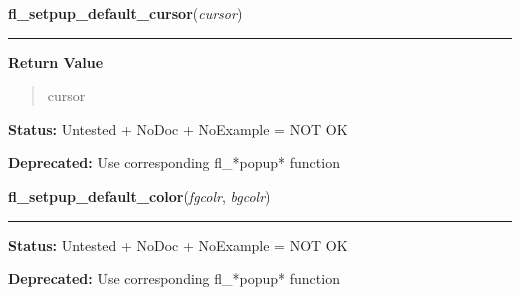     \label{xformslib:deprecated:fl_setpup_default_cursor}

    \vspace{0.5ex}

\hspace{.8\funcindent}\begin{boxedminipage}{\funcwidth}

    \raggedright \textbf{fl\_setpup\_default\_cursor}(\textit{cursor})

    \vspace{-1.5ex}

    \rule{\textwidth}{0.5\fboxrule}
\setlength{\parskip}{2ex}
\setlength{\parskip}{1ex}
      \textbf{Return Value}
    \vspace{-1ex}

      \begin{quote}
      cursor

      \end{quote}

\textbf{Status:} Untested + NoDoc + NoExample = NOT OK



\textbf{Deprecated:} Use corresponding fl\_*popup* function



    \end{boxedminipage}

    \label{xformslib:deprecated:fl_setpup_default_color}

    \vspace{0.5ex}

\hspace{.8\funcindent}\begin{boxedminipage}{\funcwidth}

    \raggedright \textbf{fl\_setpup\_default\_color}(\textit{fgcolr}, \textit{bgcolr})

    \vspace{-1.5ex}

    \rule{\textwidth}{0.5\fboxrule}
\setlength{\parskip}{2ex}
\setlength{\parskip}{1ex}
\textbf{Status:} Untested + NoDoc + NoExample = NOT OK



\textbf{Deprecated:} Use corresponding fl\_*popup* function



    \end{boxedminipage}


